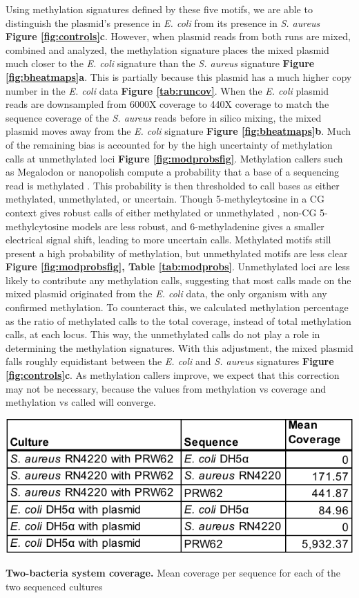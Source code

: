Using methylation signatures defined by these five motifs, we are able to distinguish the plasmid’s presence in \textit{E. coli} from its presence in \textit{S. aureus} {\bf Figure \ref{fig:controls}c}. However, when plasmid reads from both runs are mixed, combined and analyzed, the methylation signature places the mixed plasmid much closer to the \textit{E. coli} signature than the \textit{S. aureus} signature {\bf Figure \ref{fig:bheatmaps}a}. This is partially because this plasmid has a much higher copy number in the \textit{E. coli} data {\bf Figure \ref{tab:runcov}}. When the \textit{E. coli} plasmid reads are downsampled from 6000X coverage to 440X coverage to match the sequence coverage of the \textit{S. aureus} reads before in silico mixing, the mixed plasmid moves away from the \textit{E. coli} signature {\bf Figure \ref{fig:bheatmaps}b}. Much of the remaining bias is accounted for by the high uncertainty of methylation calls at unmethylated loci {\bf Figure \ref{fig:modprobsfig}}. Methylation callers such as Megalodon or nanopolish compute a probability that a base of a sequencing read is methylated \citep{Simpson2017-wb}. This probability is then thresholded to call bases as either methylated, unmethylated, or uncertain. Though 5-methylcytosine in a CG context gives robust calls of either methylated or unmethylated \citep{Simpson2017-wb}, non-CG 5-methylcytosine models are less robust, and 6-methyladenine gives a smaller electrical signal shift, leading to more uncertain calls. Methylated motifs still present a high probability of methylation, but unmethylated motifs are less clear {\bf Figure \ref{fig:modprobsfig}, Table \ref{tab:modprobs}}. Unmethylated loci are less likely to contribute any methylation calls, suggesting that most calls made on the mixed plasmid originated from the \textit{E. coli} data, the only organism with any confirmed methylation. To counteract this, we calculated methylation percentage as the ratio of methylated calls to the total coverage, instead of total methylation calls, at each locus. This way, the unmethylated calls do not play a role in determining the methylation signatures. With this adjustment, the mixed plasmid falls roughly equidistant between the \textit{E. coli} and \textit{S. aureus} signatures {\bf Figure \ref{fig:controls}c}. As methylation callers improve, we expect that this correction may not be necessary, because the values from methylation vs coverage and methylation vs called will converge.

\begin{table}[!hb]
\centering
\includegraphics[width = .5\linewidth,keepaspectratio]{figure/runcov.pdf}
\caption[Two-bacteria system coverage]{{\bf Two-bacteria system coverage.} Mean coverage per sequence for each of the two sequenced cultures }
\label{tab:runcov}
\end{table}



